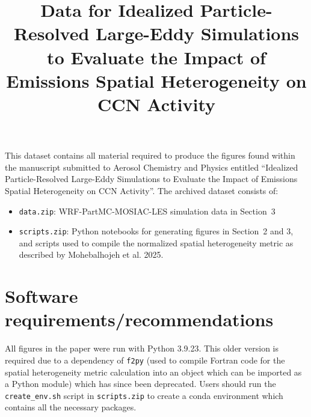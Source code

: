 \documentclass[gmd,manuscript]{copernicus}
\begin{document}
\title{Data for Idealized Particle-Resolved Large-Eddy Simulations to Evaluate the Impact of Emissions Spatial Heterogeneity on CCN Activity}









\maketitle

This dataset contains all material required to produce the figures found within the manuscript submitted to Aerosol Chemistry and Physics entitled ``Idealized Particle-Resolved Large-Eddy Simulations to Evaluate the Impact of Emissions Spatial Heterogeneity on CCN Activity''. 
The archived dataset consists of:

\begin{itemize}
\item \texttt{data.zip}: WRF-PartMC-MOSIAC-LES simulation data in Section~3
\item \texttt{scripts.zip}: Python notebooks for generating figures in Section~2 and 3, and scripts used to compile the normalized spatial heterogeneity metric as described by Mohebalhojeh et al. 2025.
\end{itemize}

\section*{Software requirements/recommendations}

All figures in the paper were run with Python 3.9.23. This older version is required due to a dependency of \texttt{f2py} (used to compile Fortran code for the spatial heterogeneity metric calculation into an object which can be imported as a Python module) which has since been deprecated.  Users should run the \texttt{create\_env.sh} script in \texttt{scripts.zip} to create a conda environment which contains all the necessary packages.
\end{document}
